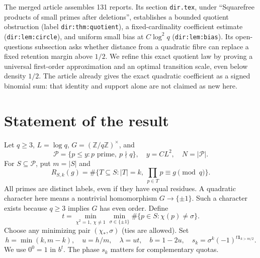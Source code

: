 \documentclass[11pt]{article}
\theoremstyle{remark}\newtheorem{remark}[theorem]{Remark}
\newcommand{\Pool}{\mathcal P}
\newcommand{\ind}{\mathbf 1}
\begin{document}
The merged article \cite{Article} assembles 131 reports. Its section \texttt{dir.tex}, under ``Squarefree products of small primes after deletions'', establishes a bounded quotient obstruction (label \texttt{dir:thm:quotient}), a fixed-cardinality coefficient estimate (\texttt{dir:lem:circle}), and uniform small bias at $C\log^2 q$ (\texttt{dir:lem:bias}). Its open-questions subsection asks whether distance from a quadratic fibre can replace a fixed retention margin above $1/2$. We refine this exact quotient law by proving a universal first-order approximation and an optimal transition scale, even below density $1/2$. The article already gives the exact quadratic coefficient as a signed binomial sum: that identity and support alone are not claimed as new here.

\section{Statement of the result}
Let $q\ge3$, $L=\log q$, $G=(\mathbb Z/q\mathbb Z)^\times$, and
\[
 \Pool=\{p\le y:p\text{ prime},\ p\nmid q\},\quad y=C L^2,\quad N=|\Pool|.
\]
For $S\subseteq\Pool$, put $m=|S|$ and
\[
 R_{S,k}(g)=\#\bigl\{T\subseteq S:|T|=k,\ \prod_{p\in T}p\equiv g\pmod q\bigr\}.
\]
All primes are distinct labels, even if they have equal residues. A quadratic character here means a nontrivial homomorphism $G\to\{\pm1\}$. Such a character exists because $q\ge3$ implies $G$ has even order. Define
\begin{equation}\label{eq:distance}
 t=\min_{\chi^2=1,\ \chi\ne1}\min_{\sigma\in\{\pm1\}}
       \#\{p\in S:\chi(p)\ne\sigma\}.
\end{equation}
Choose any minimizing pair $(\chi_*,\sigma)$ (ties are allowed). Set
\[
 h=\min(k,m-k),\quad u=h/m,\quad \lambda=ut,\quad b=1-2u,
 \quad s_k=\sigma^k(-1)^{t\ind_{k>m/2}}.
\]
We use $0^0=1$ in $b^t$. The phase $s_k$ matters for complementary quotas.
\end{document}
